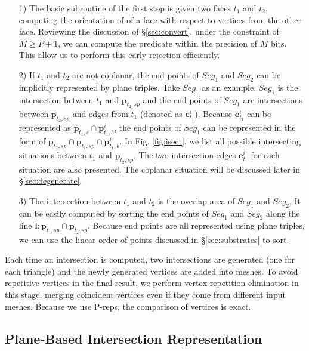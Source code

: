 \documentclass[10pt,journal,compsoc]{IEEEtran}
\begin{document}
\begin{itemize}[leftmargin=0.45cm]
  \item[1)] The basic subroutine of the first step is given two faces $t_1$ and $t_2$, computing the orientation of of a face with respect to vertices from the other face. Reviewing the discussion of \S \ref{sec:convert}, under the constraint of $M \ge P+1$, we can compute the predicate within the precision of $M$ bits. This allow us to perform this early rejection efficiently.
      \vspace{0.5em}
  \item[2)] If $t_1$ and $t_2$ are not coplanar, the end points of $Seg_1$ and $Seg_2$ can be implicitly represented by plane triples. Take $Seg_1$ as an example. $Seg_1$ is the intersection between $t_1$ and $\bm{p}_{t_2, sp}$ and the end points of $Seg_1$ are intersections between $\bm{p}_{t_2, sp}$ and edges from $t_1$ (denoted as $\bm{e}^i_{t_1}$). Because $\bm{e}^i_{t_1}$ can be represented as $\bm{p}_{t_1, s}\cap \bm{p}^i_{t_1, b}$, the end points of $Seg_1$ can be represented in the form of $\bm{p}_{t_2, sp} \cap \bm{p}_{t_1, sp} \cap \bm{p}^i_{t_1, b}$. In Fig. \ref{fig:isect}, we list all possible intersecting situations between $t_1$ and $\bm{p}_{t_2, sp}$. The two intersection edges $\bm{e}^i_{t_1}$ for each situation are also presented. The coplanar situation will be discussed later in \S \ref{sec:degenerate}.
      \vspace{0.5em}
 \item[3)] The intersection between $t_1$ and $t_2$ is the overlap area of $Seg_1$ and $Seg_2$. It can be easily computed by sorting the end points of $Seg_1$ and $Seg_2$ along the line $\bm{l}\colon \bm{p}_{t_1, sp} \cap \bm{p}_{t_2, sp}$. Because end points are all represented using plane triples, we can use the linear order of points discussed in \S \ref{sec:substrates} to sort.
\end{itemize}

Each time an intersection is computed, two intersections are generated (one for each triangle) and the newly generated vertices are added into meshes. To avoid repetitive vertices in the final result, we perform vertex repetition elimination in this stage, merging coincident vertices even if they come from different input meshes. Because we use P-reps, the comparison of vertices is exact.

\subsection{Plane-Based Intersection Representation}
\label{sec:ir}
\end{document}
